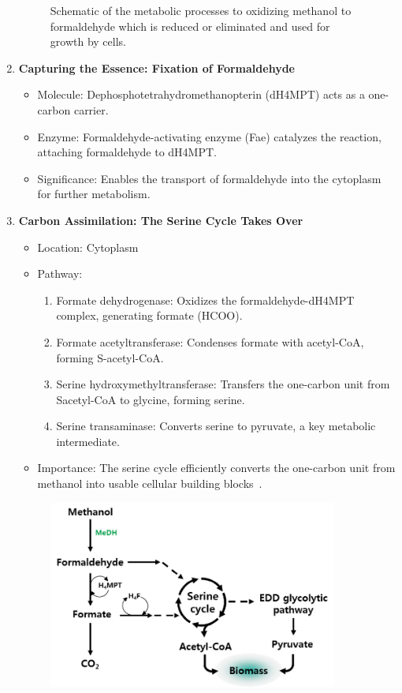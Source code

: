 \begin{enumerate}
\begin{figure}[H]
        \caption{Schematic of the metabolic processes to oxidizing methanol to formaldehyde which is reduced or eliminated and used for growth by cells.}
        \label{fig:mextorquens_metabolism_methanol}
    \end{figure}
    \item \textbf{Capturing the Essence: Fixation of Formaldehyde}
    \begin{itemize}
        \item Molecule: Dephosphotetrahydromethanopterin (dH4MPT) acts as a one-carbon
        carrier.
        \item Enzyme: Formaldehyde-activating enzyme (Fae) catalyzes the reaction, attaching
        formaldehyde to dH4MPT.
        \item Significance: Enables the transport of formaldehyde into the cytoplasm for
        further metabolism.
    \end{itemize}
    \item \textbf{Carbon Assimilation: The Serine Cycle Takes Over}
    \begin{itemize}
        \item Location: Cytoplasm
        \item Pathway:
        \begin{enumerate}
            \item Formate dehydrogenase:
            Oxidizes the formaldehyde-dH4MPT complex, generating formate (HCOO).
            \item Formate acetyltransferase:
            Condenses formate with acetyl-CoA, forming S-acetyl-CoA.
            \item Serine hydroxymethyltransferase: Transfers the one-carbon unit from Sacetyl-CoA to glycine, forming serine.
            \item Serine transaminase: Converts serine to pyruvate, a key metabolic
            intermediate.
        \end{enumerate}
        \item Importance: The serine cycle efficiently converts the one-carbon unit from
        methanol into usable cellular building blocks~\cite{methanol_metabolism}.
    \end{itemize}
    \begin{figure}[H]
        \centering
        \includegraphics[width=0.9\textwidth]{./media/images/mextorquens_metabolizing_methanol}

\end{figure}
\end{enumerate}
